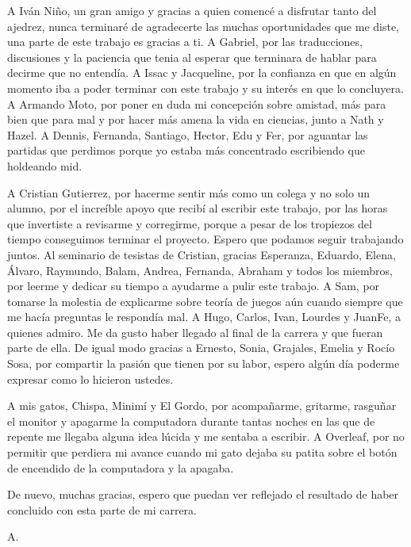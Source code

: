 \documentclass[twoside,openright,12pt,a4paper,spanish]{book}
\begin{document}
A Iván Niño, un gran amigo y gracias a quien comencé a disfrutar tanto del ajedrez, nunca terminaré de agradecerte las muchas oportunidades que me diste, una parte de este trabajo es gracias a ti. A Gabriel, por las traducciones, discusiones y la paciencia que tenia al esperar que terminara de hablar para decirme que no entendía. A Issac y Jacqueline, por la confianza en que en algún momento iba a poder terminar con este trabajo y su interés en que lo concluyera. A Armando Moto, por poner en duda mi concepción sobre amistad, más para bien que para mal y por hacer más amena la vida en ciencias, junto a Nath y Hazel. A Dennis, Fernanda, Santiago, Hector, Edu y Fer, por aguantar las partidas que perdimos porque yo estaba más concentrado escribiendo que holdeando mid.

A Cristian Gutierrez, por hacerme sentir más como un colega y no solo un alumno, por el increíble apoyo que recibí al escribir este trabajo, por las horas que invertiste a revisarme y corregirme, porque a pesar de los tropiezos del tiempo conseguimos terminar el proyecto. Espero que podamos seguir trabajando juntos. Al seminario de tesistas de Cristian, gracias Esperanza, Eduardo, Elena, Álvaro, Raymundo, Balam, Andrea, Fernanda, Abraham y todos los miembros, por leerme y dedicar su tiempo a ayudarme a pulir este trabajo. A Sam, por tomarse la molestia de explicarme sobre teoría de juegos aún cuando siempre que me hacía preguntas le respondía mal. A Hugo, Carlos, Ivan, Lourdes y JuanFe, a quienes admiro. Me da gusto haber llegado al final de la carrera y que fueran parte de ella. De igual modo gracias a Ernesto, Sonia, Grajales, Emelia y Rocío Sosa, por compartir la pasión que tienen por su labor, espero algún día poderme expresar como lo hicieron ustedes.

A mis gatos, Chispa, Minimí y El Gordo, por acompañarme, gritarme, rasguñar el monitor y apagarme la computadora durante tantas noches en las que de repente me llegaba alguna idea lúcida y me sentaba a escribir. A Overleaf, por no permitir que perdiera mi avance cuando mi gato dejaba su patita sobre el botón de encendido de la computadora y la apagaba. 

De nuevo, muchas gracias, espero que puedan ver reflejado el resultado de haber concluido con esta parte de mi carrera. \cite{sep-church-turing}

\begin{flushright}
    A.
\end{flushright}

\newpage
$\ $
\thispagestyle{empty} 
\end{document}
